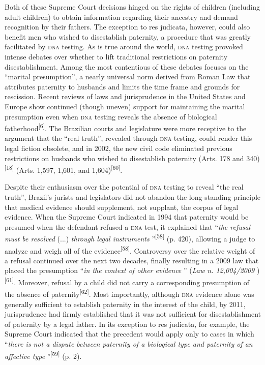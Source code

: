 \documentclass{article}
\begin{document}
Both of these Supreme Court decisions hinged on the rights of children
(including adult children) to obtain information regarding their ancestry and
demand recognition by their fathers. The exception to res judicata, however,
could also benefit men who wished to disestablish paternity, a procedure that
was greatly facilitated by \textsc{dna} testing. As is true around the world, \textsc{dna} testing
provoked intense debates over whether to lift traditional restrictions on
paternity disestablishment. Among the most contentious of these debates focuses
on the “marital presumption”, a nearly universal norm derived from Roman Law
that attributes paternity to husbands and limits the time frame and grounds for
rescission. Recent reviews of laws and jurisprudence in the United States and
Europe show continued (though uneven) support for maintaining the marital
presumption even when \textsc{dna} testing reveals the absence of biological fatherhood\textsuperscript{[}\textsuperscript{6}\textsuperscript{]}. The Brazilian courts and legislature were more receptive to the argument that
the “real truth”, revealed through \textsc{dna} testing, could render this legal fiction
obsolete, and in 2002, the new civil code eliminated previous restrictions on
husbands who wished to disestablish paternity (Arts. 178 and 340)\textsuperscript{[}\textsuperscript{18}\textsuperscript{]}
(Arts. 1,597, 1,601, and 1,604)\textsuperscript{[}\textsuperscript{60}\textsuperscript{]}.

Despite their enthusiasm over the potential of \textsc{dna} testing to reveal “the real
truth”, Brazil’s jurists and legislators did not abandon the long-standing
principle that medical evidence should supplement, not supplant, the corpus of
legal evidence. When the Supreme Court indicated in 1994 that paternity would be
presumed when the defendant refused a \textsc{dna} test, it explained that “\textit{the
refusal must be resolved}
(...) \textit{through legal instruments}
”\textsuperscript{[}\textsuperscript{58}\textsuperscript{]}
(p. 420), allowing a judge to analyze and weigh all of the evidence\textsuperscript{[}\textsuperscript{58}\textsuperscript{]}. Controversy over the relative weight of a refusal continued over the next two
decades, finally resulting in a 2009 law that placed the presumption “\textit{in
the context of other evidence}
” (\textit{Law n. 12,004/2009}
)\textsuperscript{[}\textsuperscript{61}\textsuperscript{]}. Moreover, refusal by a child did not carry a corresponding presumption of the
absence of paternity\textsuperscript{[}\textsuperscript{62}\textsuperscript{]}. Most importantly, although \textsc{dna} evidence alone was generally sufficient to
establish paternity in the interest of the child, by 2011, jurisprudence had
firmly established that it was not sufficient for disestablishment of paternity
by a legal father. In its exception to res judicata, for example, the Supreme
Court indicated that the precedent would apply only to cases in which
“\textit{there is not a dispute between paternity of a biological type and
paternity of an affective type}
”\textsuperscript{[}\textsuperscript{59}\textsuperscript{]}
(p. 2).
\end{document}
